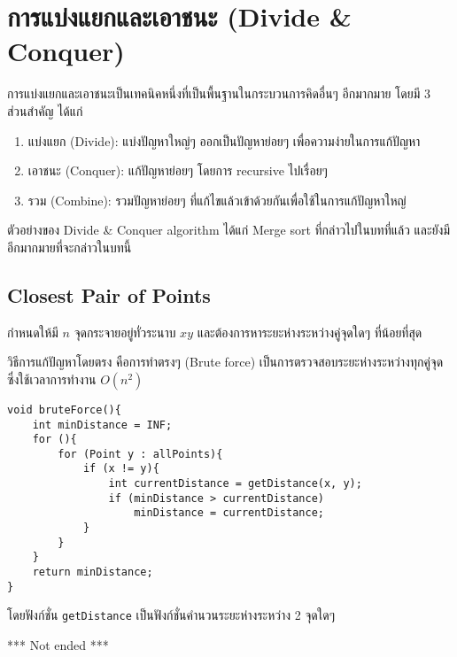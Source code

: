 \chapter{การแบ่งแยกและเอาชนะ (Divide \& Conquer)}

การแบ่งแยกและเอาชนะเป็นเทคนิคหนึ่งที่เป็นพื้นฐานในกระบวนการคิดอื่นๆ อีกมากมาย โดยมี 3 ส่วนสำคัญ ได้แก่
\begin{enumerate}
\item แบ่งแยก (Divide): แบ่งปัญหาใหญ่ๆ ออกเป็นปัญหาย่อยๆ เพื่อความง่ายในการแก้ปัญหา
\item เอาชนะ (Conquer): แก้ปัญหาย่อยๆ โดยการ recursive ไปเรื่อยๆ
\item รวม (Combine): รวมปัญหาย่อยๆ ที่แก้ไขแล้วเข้าด้วยกันเพื่อใช้ในการแก้ปัญหาใหญ่
\end{enumerate}

ตัวอย่างของ Divide \& Conquer algorithm ได้แก่ Merge sort ที่กล่าวไปในบทที่แล้ว และยังมีอีกมากมายที่จะกล่าวในบทนี้

\section{Closest Pair of Points}

กำหนดให้มี $n$ จุดกระจายอยู่ทั่วระนาบ $xy$ และต้องการหาระยะห่างระหว่างคู่จุดใดๆ ที่น้อยที่สุด

วิธีการแก้ปัญหาโดยตรง คือการทำตรงๆ (Brute force) เป็นการตรวจสอบระยะห่างระหว่างทุกคู่จุด ซึ่งใช้เวลาการทำงาน $O(n^2)$ 

\begin{lstlisting}
void bruteForce(){
	int minDistance = INF;
	for (){
		for (Point y : allPoints){
			if (x != y){
				int currentDistance = getDistance(x, y);
				if (minDistance > currentDistance)
					minDistance = currentDistance;
			}
		}
	}
	return minDistance;
}
\end{lstlisting}

โดยฟังก์ชั่น \texttt{getDistance} เป็นฟังก์ชั่นคำนวนระยะห่างระหว่าง 2 จุดใดๆ

*** Not ended ***